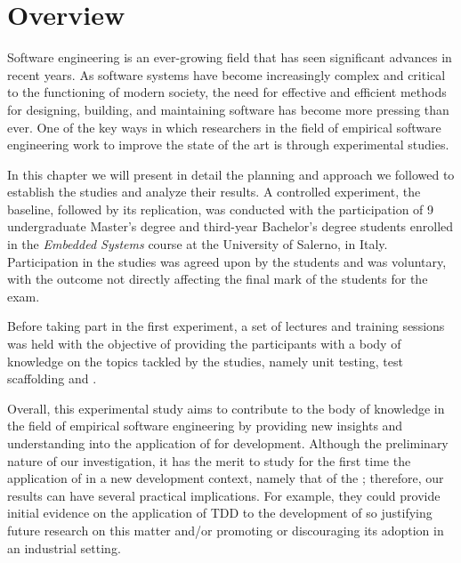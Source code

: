 \section{Overview}
Software engineering is an ever-growing field that has seen significant advances in recent years. As software systems have become increasingly complex and critical to the functioning of modern society, the need for effective and efficient methods for designing, building, and maintaining software has become more pressing than ever. One of the key ways in which researchers in the field of empirical software engineering work to improve the state of the art is through experimental studies.

In this chapter we will present in detail the planning and approach we followed to establish the studies and analyze their results. 
A controlled experiment, the baseline, followed by its replication, was conducted with the participation of 9 undergraduate Master's degree and third-year Bachelor's degree students enrolled in the \textit{Embedded Systems} course at the University of Salerno, in Italy. Participation in the studies was agreed upon by the students and was voluntary, with the outcome not directly affecting the final mark of the students for the exam.

Before taking part in the first experiment, a set of lectures and training sessions was held with the objective of providing the participants with a body of knowledge on the topics tackled by the studies, namely unit testing, test scaffolding and \tdd.

Overall, this experimental study aims to contribute to the body of knowledge in the field of empirical software engineering by providing new insights and understanding into the application of \tdd for \es development.
Although the preliminary nature of our investigation, it has the merit to study for the first time the application of \tdd in a new development context, namely that of the \ess; therefore, our results can have several practical implications. For example, they could provide initial evidence on the application of TDD to the development of \ess so justifying future research on this matter and/or promoting or discouraging its adoption in an industrial setting.



